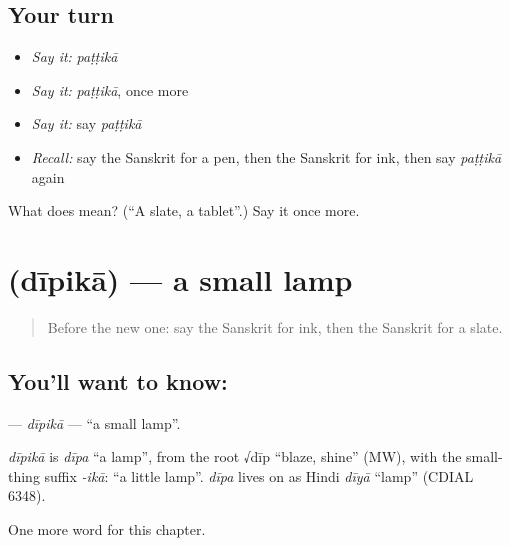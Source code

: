 \subsection*{Your turn}
\begin{itemize}
\raggedright
  \item \emph{Say it:} \emph{paṭṭikā}
  \item \emph{Say it:} \emph{paṭṭikā}, once more
  \item \emph{Say it:} say \emph{paṭṭikā}
  \item \emph{Recall:} say the Sanskrit for a pen, then the Sanskrit for ink, then say \emph{paṭṭikā} again
\end{itemize}

\begin{tcolorbox}[breakable,colback=teal!4,colframe=teal!35!black,title={Before you move on}]
What does  mean? (\textquotedblleft{}A slate, a tablet\textquotedblright{}.) Say it once more.
\end{tcolorbox}
\section[\texorpdfstring{\sk{दीपिका} (dīpikā)}{दीपिका (dīpikā)}]{ (dīpikā) — a small lamp}

\label{lesson:SA-C158-dipika}



\begin{quote}
Before the new one: say the Sanskrit for ink, then the Sanskrit for a slate.
\end{quote}

\subsection*{You'll want to know: }
\textbf{} — \emph{dīpikā} — \textquotedblleft{}a small lamp\textquotedblright{}.

\begin{cousinweb}
\emph{dīpikā} is \emph{dīpa} \textquotedblleft{}a lamp\textquotedblright{}, from the root √dīp \textquotedblleft{}blaze, shine\textquotedblright{} (MW), with the small-thing suffix \emph{-ikā}: \textquotedblleft{}a little lamp\textquotedblright{}. \emph{dīpa} lives on as Hindi \emph{dīyā} \textquotedblleft{}lamp\textquotedblright{} (CDIAL 6348).
\end{cousinweb}

\begin{grammarlens}[title={What you've built}]
One more word for this chapter.
\end{grammarlens}

